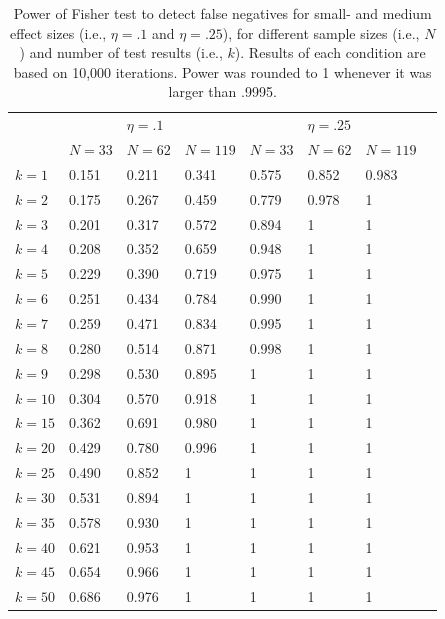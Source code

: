 \documentclass{article}
\begin{document}
\begin{table}[htbp]
\caption{Power of Fisher test to detect false negatives for small- and medium effect sizes (i.e., $\eta=.1$ and $\eta=.25$), for different sample sizes (i.e., $N$) and number of test results (i.e., $k$). Results of each condition are based on 10,000 iterations. Power was rounded to 1 whenever it was larger than .9995.}
\begin{adjustbox}{width=\textwidth,totalheight=\textheight,keepaspectratio,angle=0}
\centering
\begin{tabular}{llllllll}
&        & $\eta=.1$ &         &        & $\eta=.25$ &         \\
& $N=33$ & $N=62$ & $N=119$ & $N=33$ & $N=62$ & $N=119$ \\
\hline
$k=1$ & 0.151 & 0.211 & 0.341 & 0.575 & 0.852 & 0.983 \\
$k=2$ & 0.175 & 0.267 & 0.459 & 0.779 & 0.978 & 1 \\
$k=3$ & 0.201 & 0.317 & 0.572 & 0.894 & 1 & 1 \\
$k=4$ & 0.208 & 0.352 & 0.659 & 0.948 & 1 & 1 \\
$k=5$ & 0.229 & 0.390 & 0.719 & 0.975 & 1 & 1 \\
$k=6$ & 0.251 & 0.434 & 0.784 & 0.990 & 1 & 1 \\
$k=7$ & 0.259 & 0.471 & 0.834 & 0.995 & 1 & 1 \\
$k=8$ & 0.280 & 0.514 & 0.871 & 0.998 & 1 & 1 \\
$k=9$ & 0.298 & 0.530 & 0.895 & 1 & 1 & 1 \\
$k=10$ & 0.304 & 0.570 & 0.918 & 1 & 1 & 1 \\
$k=15$ & 0.362 & 0.691 & 0.980 & 1 & 1 & 1 \\
$k=20$ & 0.429 & 0.780 & 0.996 & 1 & 1 & 1 \\
$k=25$ & 0.490 & 0.852 & 1 & 1 & 1 & 1 \\
$k=30$ & 0.531 & 0.894 & 1 & 1 & 1 & 1 \\
$k=35$ & 0.578 & 0.930 & 1 & 1 & 1 & 1 \\
$k=40$ & 0.621 & 0.953 & 1 & 1 & 1 & 1 \\
$k=45$ & 0.654 & 0.966 & 1 & 1 & 1 & 1 \\
$k=50$ & 0.686 & 0.976 & 1 & 1 & 1 & 1 \\

\hline
\end{tabular}
\end{adjustbox}
\label{tab:tab2}
\end{table}
\end{document}
